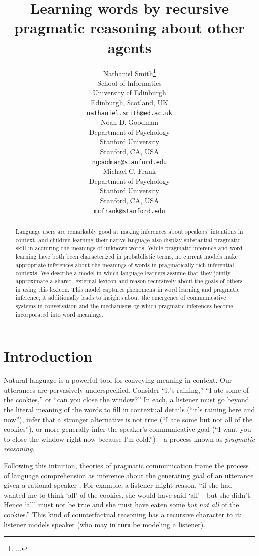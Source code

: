 \documentclass{article} %
\title{Learning words by recursive pragmatic reasoning about other agents}
\author{
Nathaniel Smith\thanks{...} \\
School of Informatics\\
University of Edinburgh\\
Edinburgh, Scotland, UK\\
\texttt{nathaniel.smith@ed.ac.uk} \\
\AND
Noah D. Goodman \\
Department of Psychology\\
Stanford University \\
Stanford, CA, USA \\
\texttt{ngoodman@stanford.edu} \\
\And
Michael C. Frank \\
Department of Psychology \\
Stanford University \\
Stanford, CA, USA \\
\texttt{mcfrank@stanford.edu}}
\begin{document}
\maketitle

\begin{abstract}
  Language users are remarkably good at making inferences about
  speakers' intentions in context, and children learning their native
  language also display substantial pragmatic skill in acquiring the
  meanings of unknown words. While pragmatic inference and word
  learning have both been characterized in probabilistic terms, no
  current models make appropriate inferences about the meanings of
  words in pragmatically-rich inferential contexts. We describe a
  model in which language learners assume that they jointly
  approximate a shared, external lexicon and reason recursively about
  the goals of others in using this lexicon. This model captures
  phenomena in word learning and pragmatic inference; it additionally
  leads to insights about the emergence of communicative systems in
  conversation and the mechanisms by which pragmatic inferences become
  incorporated into word meanings.
\end{abstract}

\section{Introduction}

Natural language is a powerful tool for conveying meaning in
context. Our utterances are pervasively underspecified. Consider
``it's raining,'' ``I ate some of the cookies,'' or ``can you close
the window?'' In each, a listener must go beyond the literal meaning
of the words to fill in contextual details (``it's raining here and
now''), infer that a stronger alternative is not true (``I ate some
but not all of the cookies''), or more generally infer the speaker's
communicative goal (``I want you to close the window right now because
I'm cold.'') -- a process known as \textit{pragmatic reasoning}.

Following this intuition, theories of pragmatic communication frame
the process of language comprehension as inference about the
generating goal of an utterance given a rational speaker
\cite{grice1975,dale1995,frank2012}. For example, a listener might
reason, ``if she had wanted me to think `all' of the cookies, she
would have said `all'---but she didn't. Hence `all' must not be true
and she must have eaten some {\it but not all} of the cookies.'' This
kind of counterfactual reasoning has a recursive character to it:
listener models speaker (who may in turn be modeling a listener).
\end{document}
